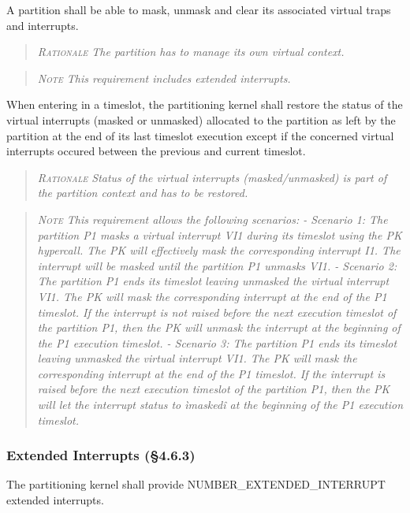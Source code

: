A partition shall be able to mask, unmask and clear its associated virtual traps and interrupts.
\begin{quote}\it
\textsc{Rationale}
The partition has to manage its own virtual context.
\end{quote}
\begin{quote}\it
\textsc{Note}
This requirement includes extended interrupts.
\end{quote}

When entering in a timeslot, the partitioning kernel shall restore the status of the virtual interrupts (masked or unmasked) allocated to the partition as left by the partition at the end of its last timeslot execution except  if the concerned virtual interrupts occured between the previous and current timeslot.
\begin{quote}\it
\textsc{Rationale}
Status of the virtual interrupts (masked/unmasked) is part of the partition context and has to be restored.
\end{quote}
\begin{quote}\it
\textsc{Note}
This requirement allows the following scenarios:
- Scenario 1: The partition P1 masks a virtual interrupt VI1 during its timeslot using the PK hypercall. The PK will effectively mask the corresponding interrupt I1. The interrupt will be masked until the partition P1 unmasks VI1.
- Scenario 2: The partition P1 ends its timeslot leaving unmasked the virtual interrupt VI1. The PK will mask the corresponding interrupt at the end of the P1 timeslot. If the interrupt is not raised before the next execution timeslot of the partition P1, then the PK will unmask the interrupt at the beginning of the P1 execution timeslot.
- Scenario 3: The partition P1 ends its timeslot leaving unmasked the virtual interrupt VI1. The PK will mask the corresponding interrupt at the end of the P1 timeslot. If the interrupt is raised before the next execution timeslot of the partition P1, then the PK will let the interrupt status to ìmaskedî at the beginning of the P1 execution timeslot.
\end{quote}

\subsubsection{Extended Interrupts (\S4.6.3)}

The partitioning kernel shall provide NUMBER\_EXTENDED\_INTERRUPT extended interrupts.

